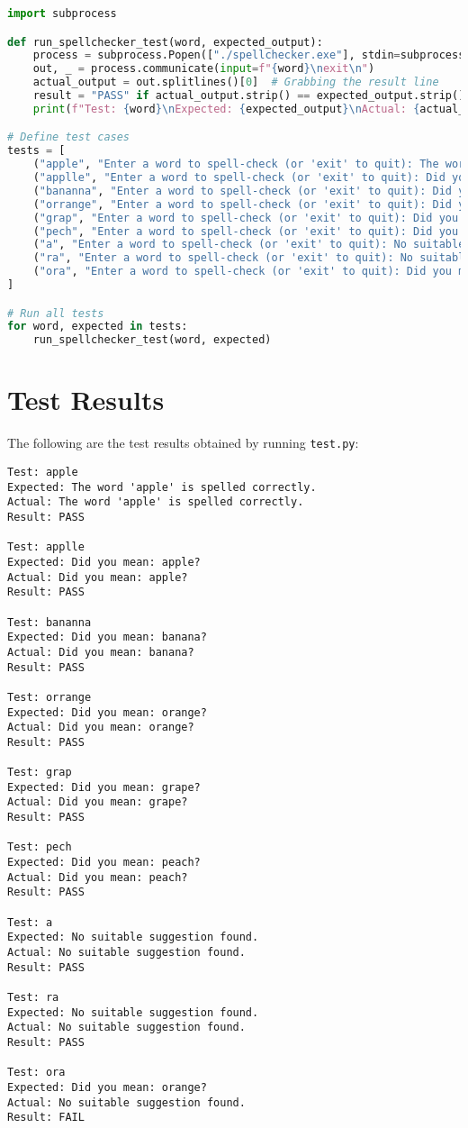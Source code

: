 \documentclass{article}
\begin{document}
\begin{lstlisting}[language=Python, caption={test.py}, label={lst:test}]
import subprocess

def run_spellchecker_test(word, expected_output):
    process = subprocess.Popen(["./spellchecker.exe"], stdin=subprocess.PIPE, stdout=subprocess.PIPE, text=True)
    out, _ = process.communicate(input=f"{word}\nexit\n")
    actual_output = out.splitlines()[0]  # Grabbing the result line
    result = "PASS" if actual_output.strip() == expected_output.strip() else "FAIL"
    print(f"Test: {word}\nExpected: {expected_output}\nActual: {actual_output}\nResult: {result}\n")

# Define test cases
tests = [
    ("apple", "Enter a word to spell-check (or 'exit' to quit): The word 'apple' is spelled correctly."),
    ("applle", "Enter a word to spell-check (or 'exit' to quit): Did you mean: apple?"),
    ("bananna", "Enter a word to spell-check (or 'exit' to quit): Did you mean: banana?"),
    ("orrange", "Enter a word to spell-check (or 'exit' to quit): Did you mean: orange?"),
    ("grap", "Enter a word to spell-check (or 'exit' to quit): Did you mean: grape?"),
    ("pech", "Enter a word to spell-check (or 'exit' to quit): Did you mean: peach?"),
    ("a", "Enter a word to spell-check (or 'exit' to quit): No suitable suggestion found."),
    ("ra", "Enter a word to spell-check (or 'exit' to quit): No suitable suggestion found."),
    ("ora", "Enter a word to spell-check (or 'exit' to quit): Did you mean: orange?"),
]

# Run all tests
for word, expected in tests:
    run_spellchecker_test(word, expected)
\end{lstlisting}

\section*{Test Results}
The following are the test results obtained by running \texttt{test.py}:

\begin{verbatim}
Test: apple
Expected: The word 'apple' is spelled correctly.
Actual: The word 'apple' is spelled correctly.
Result: PASS

Test: applle
Expected: Did you mean: apple?
Actual: Did you mean: apple?
Result: PASS

Test: bananna
Expected: Did you mean: banana?
Actual: Did you mean: banana?
Result: PASS

Test: orrange
Expected: Did you mean: orange?
Actual: Did you mean: orange?
Result: PASS

Test: grap
Expected: Did you mean: grape?
Actual: Did you mean: grape?
Result: PASS

Test: pech
Expected: Did you mean: peach?
Actual: Did you mean: peach?
Result: PASS

Test: a
Expected: No suitable suggestion found.
Actual: No suitable suggestion found.
Result: PASS

Test: ra
Expected: No suitable suggestion found.
Actual: No suitable suggestion found.
Result: PASS

Test: ora
Expected: Did you mean: orange?
Actual: No suitable suggestion found.
Result: FAIL
\end{verbatim}
\end{document}
